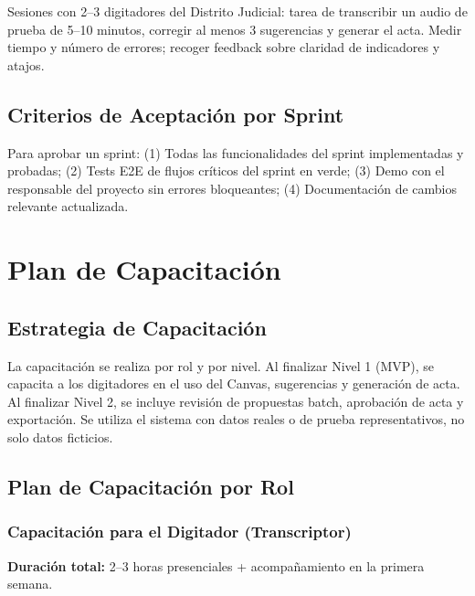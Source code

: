 \documentclass[12pt,a4paper]{report}
\begin{document}
Sesiones con 2--3 digitadores del Distrito Judicial: tarea de transcribir un audio de prueba de 5--10 minutos, corregir al menos 3 sugerencias y generar el acta. Medir tiempo y número de errores; recoger feedback sobre claridad de indicadores y atajos.

\section{Criterios de Aceptación por Sprint}

Para aprobar un sprint: (1) Todas las funcionalidades del sprint implementadas y probadas; (2) Tests E2E de flujos críticos del sprint en verde; (3) Demo con el responsable del proyecto sin errores bloqueantes; (4) Documentación de cambios relevante actualizada.

\chapter{Plan de Capacitación}

\section{Estrategia de Capacitación}

La capacitación se realiza por rol y por nivel. Al finalizar Nivel 1 (MVP), se capacita a los digitadores en el uso del Canvas, sugerencias y generación de acta. Al finalizar Nivel 2, se incluye revisión de propuestas batch, aprobación de acta y exportación. Se utiliza el sistema con datos reales o de prueba representativos, no solo datos ficticios.

\section{Plan de Capacitación por Rol}

\subsection{Capacitación para el Digitador (Transcriptor)}

\textbf{Duración total:} 2--3 horas presenciales + acompañamiento en la primera semana.
\end{document}
